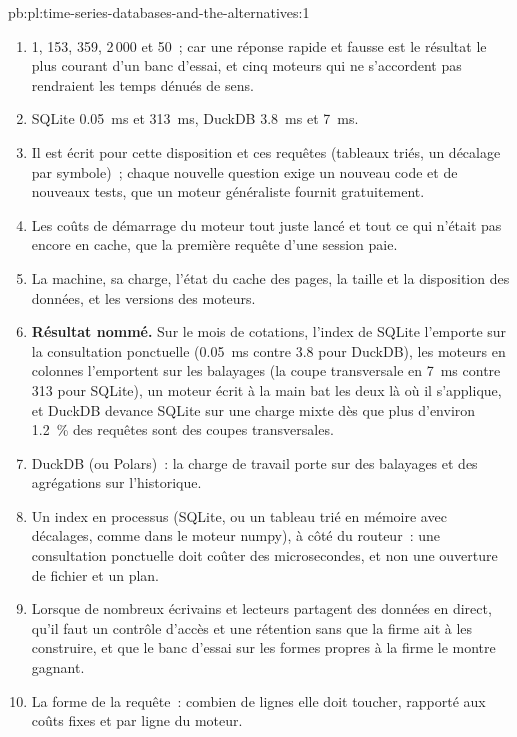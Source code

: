 \begin{solution}{pb:pl:time-series-databases-and-the-alternatives:1}
\begin{enumerate}
\item 1, 153, 359, 2\,000 et 50~; car une réponse rapide et fausse est le résultat le plus courant d'un banc d'essai, et cinq moteurs qui ne s'accordent pas rendraient les temps
dénués de sens.
\item SQLite 0.05~ms et 313~ms, DuckDB 3.8~ms et 7~ms.
\item Il est écrit pour cette disposition et ces requêtes (tableaux triés, un décalage par symbole)~; chaque nouvelle question exige un nouveau code et de nouveaux tests, que
un moteur généraliste fournit gratuitement.
\item Les coûts de démarrage du moteur tout juste lancé et tout ce qui n'était pas encore en cache, que la première requête d'une session paie.
\item La machine, sa charge, l'état du cache des pages, la taille et la disposition des données, et les versions des moteurs.
\item \textbf{Résultat nommé.} Sur le mois de cotations, l'index de SQLite l'emporte sur la consultation ponctuelle (0.05~ms contre 3.8 pour DuckDB), les
moteurs en colonnes l'emportent sur les balayages (la coupe transversale en 7~ms contre 313 pour SQLite), un moteur écrit à la main bat les deux là où il s'applique,
et DuckDB devance SQLite sur une charge mixte dès que plus d'environ 1.2~\% des requêtes sont des coupes transversales.
\item DuckDB (ou Polars)~: la charge de travail porte sur des balayages et des agrégations sur l'historique.
\item Un index en processus (SQLite, ou un tableau trié en mémoire avec décalages, comme dans le moteur numpy), à côté du routeur~: une
consultation ponctuelle doit coûter des microsecondes, et non une ouverture de fichier et un plan.
\item Lorsque de nombreux écrivains et lecteurs partagent des données en direct, qu'il faut un contrôle d'accès et une rétention sans que la firme ait à les construire, et que
le banc d'essai sur les formes propres à la firme le montre gagnant.
\item La forme de la requête~: combien de lignes elle doit toucher, rapporté aux coûts fixes et par ligne du moteur.
\end{enumerate}
\end{solution}


